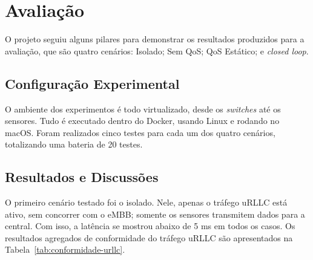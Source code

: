 \documentclass[12pt]{article}
\begin{document}
		
	
		\section{Avalia\c{c}\~ao}
		
		O projeto seguiu alguns pilares para demonstrar os resultados produzidos para a avaliação, que são quatro cenários: Isolado; Sem QoS; QoS Estático; e \textit{closed loop}.
		
		\subsection{Configura\c{c}\~ao Experimental}

        O ambiente dos experimentos é todo virtualizado, desde os \textit{switches} até os sensores. Tudo é executado dentro do Docker, usando Linux e rodando no macOS. Foram realizados cinco testes para cada um dos quatro cenários, totalizando uma bateria de 20 testes.

        \subsection{Resultados e Discussões}
        
        O primeiro cenário testado foi o isolado. Nele, apenas o tráfego uRLLC está ativo, sem concorrer com o eMBB; somente os sensores transmitem dados para a central. Com isso, a latência se mostrou abaixo de 5 ms em todos os casos. Os resultados agregados de conformidade do tráfego uRLLC são apresentados na Tabela~\ref{tab:conformidade-urllc}.

		\begin{table}[ht]
			\centering
			\caption{Métricas agregadas de conformidade do tráfego uRLLC.}
			\label{tab:conformidade-urllc}
			\scriptsize
		\end{table}
\end{document}
